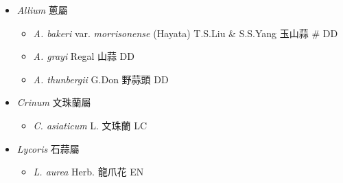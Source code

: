 
  \begin{itemize}
 \item[] \textit{Allium} 蔥屬
                                
  \begin{itemize}
        \item[] \textit{A. bakeri} var. \textit{morrisonense} (Hayata) T.S.Liu \& S.S.Yang  玉山蒜  \# DD
        \item[] \textit{A. grayi} Regal  山蒜   DD
        \item[] \textit{A. thunbergii} G.Don  野蒜頭   DD
  \end{itemize}
 \item[] \textit{Crinum} 文珠蘭屬
                                
  \begin{itemize}
        \item[] \textit{C. asiaticum} L.  文珠蘭   LC
  \end{itemize}
 \item[] \textit{Lycoris} 石蒜屬
                                
  \begin{itemize}
        \item[] \textit{L. aurea} Herb.  龍爪花   EN
  \end{itemize}
  \end{itemize}
